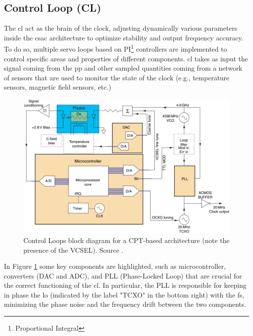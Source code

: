 \subsection{Control Loop (CL)}
\label{subsec:control_loop}

The \acrfull{cl} act as the brain of the clock, adjusting dynamically various parameters inside the \acrshort{csac} architecture to optimize stability and output frequency accuracy.
To do so, multiple servo loops based on PI\footnote{Proportional Integral} controllers are implemented to control specific areas and properties of different components. \acrshort{cl} takes as input the signal coming from the \acrfull{pp} and other sampled quantities coming from a network of sensors that are used to monitor the state of the clock (e.g., temperature sensors, magnetic field sensors, etc.)

\begin{figure}[H]
    \centering
    \includegraphics[width=.7\textwidth, max width=\linewidth]{img/control-loop.png}
    \caption{Control Loops block diagram for a CPT-based architecture (note the presence of the VCSEL). Source \cite{Knappe}.}
    \label{fig:control-loop}
\end{figure}

In Figure \ref{fig:control-loop} some key components are highlighted, such as microcontroller, converters (DAC and ADC), and PLL (Phase-Locked Loop) that are crucial for the correct functioning of the \acrshort{cl}.
In particular, the PLL is responsible for keeping in phase the \acrshort{lo} (indicated by the label "TCXO" in the bottom right) with the \acrshort{fs}, minimizing the phase noise and the frequency drift between the two components.

